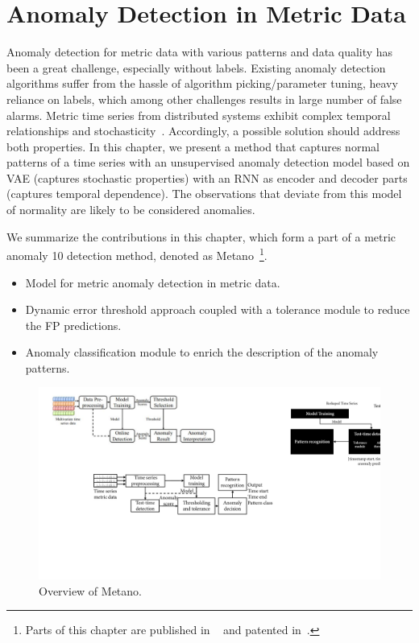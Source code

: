 
\chapter{Anomaly Detection in Metric Data} %
\label{ch:metrics}
\minitoc
\bigskip

Anomaly detection for metric data with various
patterns and data quality has been a great challenge, especially
without labels. Existing anomaly detection algorithms suffer from the hassle of algorithm picking/parameter tuning, heavy reliance on labels, which among other challenges results in large number of false alarms. Metric time series from distributed systems exhibit complex temporal relationships and stochasticity~\cite{donut,fraccaro2016sequential}. 
Accordingly, a possible solution should address both properties. In this chapter, we present a method that captures normal patterns of a time series with an unsupervised anomaly detection model based on VAE (captures stochastic properties) with an RNN as encoder and decoder parts (captures temporal dependence). The observations that deviate from this model of normality are likely to be considered anomalies. 


We summarize the contributions in this chapter, which form a part of a metric anomaly 
10
 detection method, denoted as Metano~\footnote{Parts of this chapter are published in ~\cite{nedelkoski2019anomaly,nedelkoski2020rca,nedelkoski2019edge} and patented in~\cite{nedelkoski2020patent}.}.
\begin{itemize}
\item Model for metric anomaly detection in metric data.
\item Dynamic error threshold approach coupled with a tolerance module to reduce the FP predictions.
\item Anomaly classification module to enrich the description of the anomaly patterns.
\end{itemize}


\begin{figure}[htbp]
\centerline{\includegraphics[width=1.0\textwidth]{gfx/chap4/metanooverview.pdf}}
\caption{Overview of Metano.}
\label{fig:metanooverview}
\end{figure}

